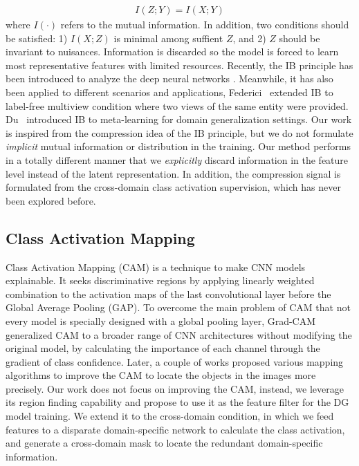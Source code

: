 \begin{eqnarray}
  \label{eqn:ib}
  I(Z; Y) = I(X; Y)
\end{eqnarray}
where $I(\cdot)$ refers to the mutual information. In addition, two conditions should be satisfied: 1) $I(X; Z)$ is minimal among suffient $Z$, and 2) $Z$ should be invariant to nuisances. Information is discarded so the model is forced to learn most representative features with limited resources.
Recently, the IB principle has been introduced to analyze the deep neural networks \citep{amjad2019learning,kolchinsky2018caveats,peng2018variational,shwartz2017opening,tishby2015deep}. Meanwhile, it has also been applied to different scenarios and applications, \eg Federici~\etal \citep{federici2020learning} extended IB to label-free multiview condition where two views of the same entity were provided. Du~\etal \citep{du2020learning} introduced IB to meta-learning for domain generalization settings. Our work is inspired from the compression idea of the IB principle, but we do not formulate \textit{implicit} mutual information or distribution in the training. Our method performs in a totally different manner that we \textit{explicitly} discard information in the feature level instead of the latent representation. In addition, the compression signal is formulated from the cross-domain class activation supervision, which has never been explored before.

\subsection{Class Activation Mapping}
Class Activation Mapping (CAM) \citep{zhou2016learning} is a technique to make CNN models explainable. It seeks discriminative regions by applying linearly weighted combination to the activation maps of the last convolutional layer before the Global Average Pooling (GAP). To overcome the main problem of CAM that not every model is specially designed with a global pooling layer, Grad-CAM \citep{selvaraju2017grad} generalized CAM to a broader range of CNN architectures without modifying the original model, by calculating the importance of each channel through the gradient of class confidence. Later, a couple of works \citep{chattopadhay2018grad,omeiza2019smooth,wang2020score} proposed various mapping algorithms to improve the CAM to locate the objects in the images more precisely. Our work does not focus on improving the CAM, instead, we leverage its region finding capability and propose to use it as the feature filter for the DG model training. We extend it to the cross-domain condition, in which we feed features to a disparate domain-specific network to calculate the class activation, and generate a cross-domain mask to locate the redundant domain-specific information.

